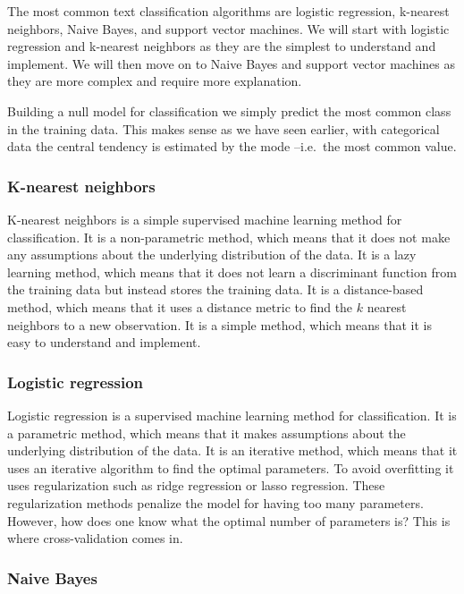 \documentclass[
  letterpaper,
]{scrbook}
\begin{document}
The most common text classification algorithms are logistic regression,
k-nearest neighbors, Naive Bayes, and support vector machines. We will
start with logistic regression and k-nearest neighbors as they are the
simplest to understand and implement. We will then move on to Naive
Bayes and support vector machines as they are more complex and require
more explanation.

Building a null model for classification we simply predict the most
common class in the training data. This makes sense as we have seen
earlier, with categorical data the central tendency is estimated by the
mode --i.e.~the most common value.

\hypertarget{pda-k-nearest-neighbors}{%
\subsubsection{K-nearest neighbors}\label{pda-k-nearest-neighbors}}

K-nearest neighbors is a simple supervised machine learning method for
classification. It is a non-parametric method, which means that it does
not make any assumptions about the underlying distribution of the data.
It is a lazy learning method, which means that it does not learn a
discriminant function from the training data but instead stores the
training data. It is a distance-based method, which means that it uses a
distance metric to find the \(k\) nearest neighbors to a new
observation. It is a simple method, which means that it is easy to
understand and implement.

\hypertarget{pda-logistic-regression}{%
\subsubsection{Logistic regression}\label{pda-logistic-regression}}

Logistic regression is a supervised machine learning method for
classification. It is a parametric method, which means that it makes
assumptions about the underlying distribution of the data. It is an
iterative method, which means that it uses an iterative algorithm to
find the optimal parameters. To avoid overfitting it uses regularization
such as ridge regression or lasso regression. These regularization
methods penalize the model for having too many parameters. However, how
does one know what the optimal number of parameters is? This is where
cross-validation comes in.

\hypertarget{pda-naive-bayes}{%
\subsubsection{Naive Bayes}\label{pda-naive-bayes}}
\end{document}
